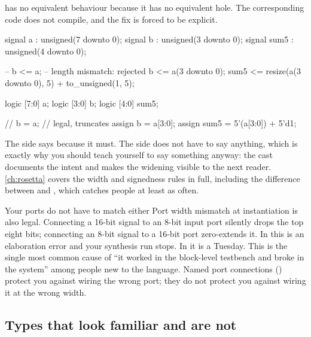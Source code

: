 \VHDL{} has no equivalent behaviour because it has no equivalent hole. The
corresponding code does not compile, and the fix is forced to be explicit.

\begin{rosetta}
\begin{rleft}
signal a    : unsigned(7 downto 0);
signal b    : unsigned(3 downto 0);
signal sum5 : unsigned(4 downto 0);

-- b <= a;  -- length mismatch: rejected
b    <= a(3 downto 0);
sum5 <= resize(a(3 downto 0), 5)
      + to_unsigned(1, 5);
\end{rleft}
\begin{rright}
logic [7:0] a;
logic [3:0] b;
logic [4:0] sum5;

// b = a;   // legal, truncates
assign b    = a[3:0];
assign sum5 = 5'(a[3:0]) + 5'd1;
\end{rright}
\end{rosetta}

The \VHDL{} side says  because it must. The \SV{} side does not
have to say anything, which is exactly why you should teach yourself to say
something anyway: the cast  documents the intent and makes the
widening visible to the next reader. \cref{ch:rosetta} covers the width and
signedness rules in full, including the difference between \code{>>} and
\code{>>>}, which catches people at least as often.

\begin{gotcha}{Your ports do not have to match either}
Port width mismatch at instantiation is also legal. Connecting a 16-bit signal
to an 8-bit input port silently drops the top eight bits; connecting an 8-bit
signal to a 16-bit port zero-extends it. In \VHDL{} this is an elaboration
error and your synthesis run stops. In \SV{} it is a Tuesday. This is the
single most common cause of ``it worked in the block-level testbench and broke
in the system'' among people new to the language. Named port connections
() protect you against wiring the wrong port; they do
not protect you against wiring it at the wrong width.
\end{gotcha}

\subsection{Types that look familiar and are not}

